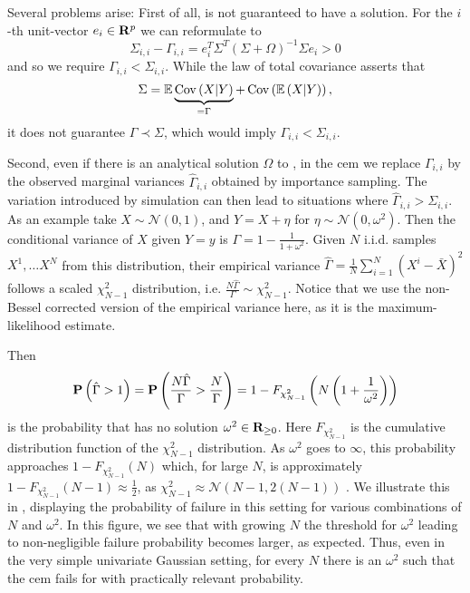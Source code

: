 Several problems arise: First of all,  is not guaranteed to have a solution. For the $i$-th unit-vector $e_{i}\in\R^{p}$ we can reformulate  to 
$$
\Sigma_{i,i} - \Gamma_{i,i} = e_{i}^T\Sigma^{T} \left( \Sigma + \Omega \right)^{-1}\Sigma e_{i} > 0
$$
and so we require $\Gamma_{i,i} < \Sigma_{i,i}$. While the law of total covariance asserts that
$$
\Sigma = \E \underbrace{\cov \left( X | Y \right)}_{=\Gamma} + \cov \left( \E \left( X | Y \right) \right),
$$
it does not guarantee $\Gamma \prec \Sigma$, which would imply $\Gamma_{i,i} < \Sigma_{i,i}$. 

Second, even if there is an analytical solution $\Omega$ to , in the \gls{cem} we replace $\Gamma_{i,i}$ by the observed marginal variances $\hat\Gamma_{i,i}$ obtained by importance sampling. The variation introduced by simulation can then lead to situations where $\hat\Gamma_{i,i} > \Sigma_{i,i}$. As an example take $X \sim \mathcal N(0, 1)$, and $Y = X + \eta$ for $\eta \sim \mathcal N(0, \omega^{2})$. Then the conditional variance of $X$ given $Y = y$ is $\Gamma = 1 - \frac{1}{1 + \omega^{2}}$. Given $N$ i.i.d. samples $X^{1}, \dots X^{N}$ from this distribution, their empirical variance $\hat \Gamma = \frac{1}{N} \sum_{i = 1}^{N} (X^{i} - \bar X)^{2} $ follows a scaled $\chi_{N - 1}^{2}$ distribution, i.e. $ \frac{N\hat\Gamma}{\Gamma} \sim \chi^{2}_{N - 1}$. Notice that we use the non-Bessel corrected version of the empirical variance here, as it is the maximum-likelihood estimate. 

Then $$\P \left( \hat \Gamma > 1 \right) = \P \left( \frac{N \hat \Gamma}{\Gamma} > \frac{N}{\Gamma} \right) = 1 - F_{\chi^{2}_{N-1}} \left( N \left( 1 + \frac{1}{\omega^{2}} \right) \right)$$ is the probability that  has no solution $\omega^{2} \in \R_{\geq 0}$. Here $F_{\chi^{2}_{N - 1}}$ is the cumulative distribution function of the $\chi^{2}_{N - 1}$ distribution. As $\omega^{2}$ goes to $\infty$, this probability approaches $1 - F_{\chi^{2}_{N - 1}}(N)$ which, for large $N$, is approximately $1 - F_{\chi^{2}_{N - 1}} (N - 1) \approx \frac{1}{2}$, as $\chi^{2}_{N-1} \approx \mathcal N\left(N - 1, 2 (N-1)\right)$ \citep[Section 18.5]{Johnson1994Continuous}.
We illustrate this in , displaying the probability of failure in this setting for various combinations of $N$ and $\omega^{2}$. In this figure, we see that with growing $N$ the threshold for $\omega^{2}$ leading to non-negligible failure probability becomes larger, as expected. 
Thus, even in the very simple univariate Gaussian setting, for every $N$ there is an $\omega^{2}$ such that the \gls{cem} fails for  with practically relevant probability. 

